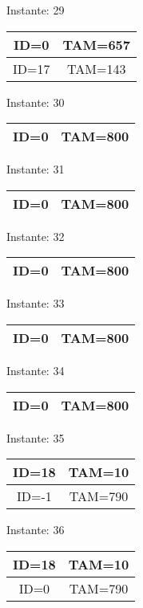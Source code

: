 \documentclass[10pt,a4paper]{article}
\begin{document}
\pagebreak
\begin{center}

Instante: 29

\begin{tabular}{|c|c|}
\hline
ID=0 & TAM=657 \\ \hline
ID=17 & TAM=143 \\ \hline
\end{tabular}
\end{center}
\pagebreak
\begin{center}

Instante: 30

\begin{tabular}{|c|c|}
\hline
ID=0 & TAM=800 \\ \hline
\end{tabular}
\end{center}
\pagebreak
\begin{center}

Instante: 31

\begin{tabular}{|c|c|}
\hline
ID=0 & TAM=800 \\ \hline
\end{tabular}
\end{center}
\pagebreak
\begin{center}

Instante: 32

\begin{tabular}{|c|c|}
\hline
ID=0 & TAM=800 \\ \hline
\end{tabular}
\end{center}
\pagebreak
\begin{center}

Instante: 33

\begin{tabular}{|c|c|}
\hline
ID=0 & TAM=800 \\ \hline
\end{tabular}
\end{center}
\pagebreak
\begin{center}

Instante: 34

\begin{tabular}{|c|c|}
\hline
ID=0 & TAM=800 \\ \hline
\end{tabular}
\end{center}
\pagebreak
\begin{center}

Instante: 35

\begin{tabular}{|c|c|}
\hline
ID=18 & TAM=10 \\ \hline
ID=-1 & TAM=790 \\ \hline
\end{tabular}
\end{center}
\pagebreak
\begin{center}

Instante: 36

\begin{tabular}{|c|c|}
\hline
ID=18 & TAM=10 \\ \hline
ID=0 & TAM=790 \\ \hline
\end{tabular}
\end{center}
\pagebreak
\end{document}
